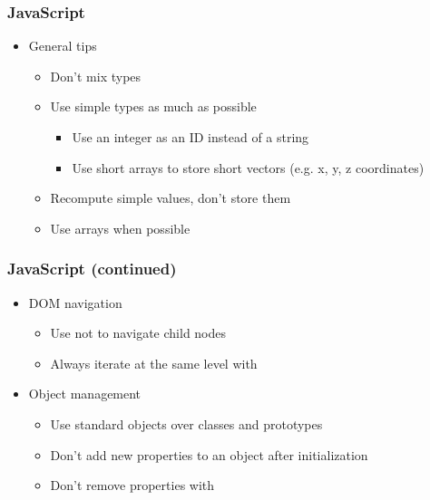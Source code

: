 \begin{frame}
 \frametitle{JavaScript}
 \begin{itemize}
  \item General tips
  \begin{itemize}
   \item Don't mix types
   \item Use simple types as much as possible
   \begin{itemize}
    \item Use an integer as an ID instead of a string
    \item Use short arrays to store short vectors (e.g. x, y, z coordinates)
   \end{itemize}
   \item Recompute simple values, don't store them
   \item Use arrays when possible
  \end{itemize}
 \end{itemize}
\end{frame}

\begin{frame}
 \frametitle{JavaScript (continued)}
 \begin{itemize}
  \item DOM navigation
   \begin{itemize}
    \item Use  not  to
          navigate child nodes
    \item Always iterate at the same level with 
   \end{itemize}
  \item Object management
  \begin{itemize}
   \item Use standard objects over classes and prototypes
   \item Don't add new properties to an object after initialization
   \item Don't remove properties with 
  \end{itemize}
 \end{itemize}
\end{frame}

